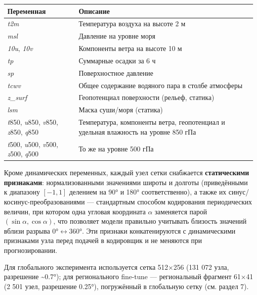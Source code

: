 \documentclass[14pt,a4paper]{extarticle}
\newcounter{none}
\numberwithin{table}{section}
\numberwithin{figure}{section}
\numberwithin{equation}{section}
\begin{document}
{\def\LTcaptype{none} %
\begin{longtable}[]{@{}
  >{\raggedright\arraybackslash}p{}
  >{\raggedright\arraybackslash}p{}@{}}
\toprule\noalign{}
\begin{minipage}[b]{\linewidth}\raggedright
Переменная
\end{minipage} & \begin{minipage}[b]{\linewidth}\raggedright
Описание
\end{minipage} \\
\midrule\noalign{}
\endhead
\bottomrule\noalign{}
\endlastfoot
\emph{t2m} & Температура воздуха на высоте 2 м \\
\emph{msl} & Давление на уровне моря \\
\emph{10u}, \emph{10v} & Компоненты ветра на высоте 10 м \\
\emph{tp} & Суммарные осадки за 6 ч \\
\emph{sp} & Поверхностное давление \\
\emph{tcwv} & Общее содержание водяного пара в столбе атмосферы \\
\emph{z\_surf} & Геопотенциал поверхности (рельеф, статика) \\
\emph{lsm} & Маска суши/моря (статика) \\
\emph{t}850, \emph{u}850, \emph{v}850, \emph{z}850, \emph{q}850 &
Температура, компоненты ветра, геопотенциал и удельная влажность на
уровне 850 гПа \\
\emph{t}500, \emph{u}500, \emph{v}500, \emph{z}500, \emph{q}500 &
То же на уровне 500 гПа \\
\end{longtable}
}

Кроме динамических переменных, каждый узел сетки снабжается
\textbf{статическими признаками}: нормализованными значениями широты
и долготы (приведёнными к диапазону \([-1, 1]\) делением на 90° и 180°
соответственно), а также их синус/косинус-преобразованиями ---
стандартным способом кодирования периодических величин, при котором
одна угловая координата \(\alpha\) заменяется парой \((\sin\alpha,
\cos\alpha)\), что позволяет модели правильно учитывать близость
значений вблизи разрыва \(0° \leftrightarrow 360°\). Эти признаки
конкатенируются с динамическими признаками узла перед подачей в
кодировщик и не меняются при прогнозировании.

Для глобального эксперимента используется сетка 512×256 (131 072 узла,
разрешение \textasciitilde0.7°); для регионального fine-tune ---
региональный фрагмент 61×41 (2 501 узел, разрешение 0.25°), погружённый
в глобальную сетку (см. раздел 7).
\end{document}
